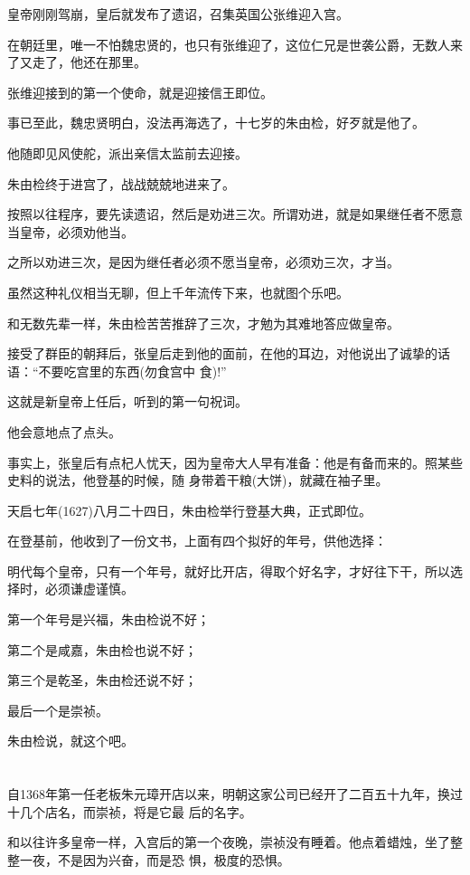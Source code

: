 \documentclass[11pt,a4paper,onecolumn]{article}
\begin{document}
皇帝刚刚驾崩，皇后就发布了遗诏，召集英国公张维迎入宫。

在朝廷里，唯一不怕魏忠贤的，也只有张维迎了，这位仁兄是世袭公爵，无数人来了又走了，他还在那里。

张维迎接到的第一个使命，就是迎接信王即位。

事已至此，魏忠贤明白，没法再海选了，十七岁的朱由检，好歹就是他了。

他随即见风使舵，派出亲信太监前去迎接。

朱由检终于进宫了，战战兢兢地进来了。

按照以往程序，要先读遗诏，然后是劝进三次。所谓劝进，就是如果继任者不愿意当皇帝，必须劝他当。

之所以劝进三次，是因为继任者必须不愿当皇帝，必须劝三次，才当。

虽然这种礼仪相当无聊，但上千年流传下来，也就图个乐吧。

和无数先辈一样，朱由检苦苦推辞了三次，才勉为其难地答应做皇帝。

接受了群臣的朝拜后，张皇后走到他的面前，在他的耳边，对他说出了诚挚的话语：``不要吃宫里的东西(勿食宫中
食)!''

这就是新皇帝上任后，听到的第一句祝词。

他会意地点了点头。

事实上，张皇后有点杞人忧天，因为皇帝大人早有准备：他是有备而来的。照某些史料的说法，他登基的时候，随
身带着干粮(大饼)，就藏在袖子里。

天启七年(1627)八月二十四日，朱由检举行登基大典，正式即位。

在登基前，他收到了一份文书，上面有四个拟好的年号，供他选择：

明代每个皇帝，只有一个年号，就好比开店，得取个好名字，才好往下干，所以选择时，必须谦虚谨慎。

第一个年号是兴福，朱由检说不好；

第二个是咸嘉，朱由检也说不好；

第三个是乾圣，朱由检还说不好；

最后一个是崇祯。

朱由检说，就这个吧。

\section[\thesection]{}

自1368年第一任老板朱元璋开店以来，明朝这家公司已经开了二百五十九年，换过十几个店名，而崇祯，将是它最
后的名字。

和以往许多皇帝一样，入宫后的第一个夜晚，崇祯没有睡着。他点着蜡烛，坐了整整一夜，不是因为兴奋，而是恐
惧，极度的恐惧。
\end{document}
